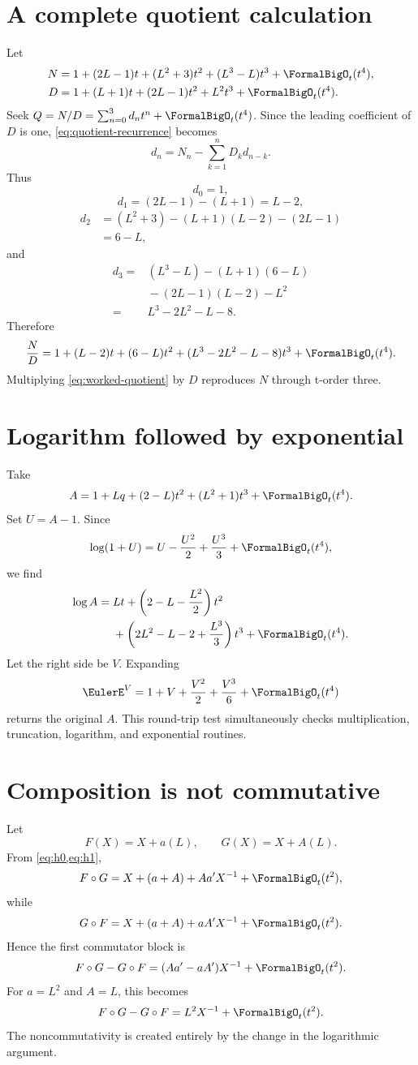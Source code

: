 \documentclass[11pt,openany]{book}
\theoremstyle{definition}
\theoremstyle{plain}
\theoremstyle{remark}
\newcommand{\compose}{\mathbin{\circ}}
\begin{document}
\section{A complete quotient calculation}
Let
\begin{align*}
 N={}&1+(2L-1)t+(L^2+3)t^2+(L^3-L)t^3+\FormalBigO_t(t^4),\\
 D={}&1+(L+1)t+(2L-1)t^2+L^2t^3+\FormalBigO_t(t^4).
\end{align*}
Seek \(Q=N/D=\sum_{n=0}^3d_nt^n+\FormalBigO_t(t^4)\).  Since the leading coefficient of
\(D\) is one, \cref{eq:quotient-recurrence} becomes
\[
 d_n=N_n-\sum_{k=1}^nD_kd_{n-k}.
\]
Thus
\[
 d_0=1,
\]
\[
 d_1=(2L-1)-(L+1)=L-2,
\]
\begin{align*}
 d_2&=(L^2+3)-(L+1)(L-2)-(2L-1)\\
 &=6-L,
\end{align*}
and
\begin{align*}
 d_3={}&(L^3-L)-(L+1)(6-L)\\
 &{}-(2L-1)(L-2)-L^2\\
={}&L^3-2L^2-L-8.
\end{align*}
Therefore
\begin{equation}\label{eq:worked-quotient}
 \frac ND=1+(L-2)t+(6-L)t^2
 +(L^3-2L^2-L-8)t^3+\FormalBigO_t(t^4).
\end{equation}
Multiplying \cref{eq:worked-quotient} by \(D\) reproduces \(N\) through
t-order three.

\section{Logarithm followed by exponential}
Take
\[
 A=1+Lq+(2-L)t^2+(L^2+1)t^3+\FormalBigO_t(t^4).
\]
Set \(U=A-1\).  Since
\[
 \log(1+U)=U-\frac{U^2}{2}+\frac{U^3}{3}+\FormalBigO_t(t^4),
\]
we find
\begin{equation}\label{eq:worked-log}
\begin{split}
 \log A={}&Lt+
 \left(2-L-\frac{L^2}{2}\right)t^2\\
 &+\left(2L^2-L-2+\frac{L^3}{3}\right)t^3
 +\FormalBigO_t(t^4).
\end{split}
\end{equation}
Let the right side be \(V\).  Expanding
\[
 \EulerE^V=1+V+\frac{V^2}{2}+\frac{V^3}{6}+\FormalBigO_t(t^4)
\]
returns the original \(A\).  This round-trip test simultaneously checks
multiplication, truncation, logarithm, and exponential routines.

\section{Composition is not commutative}
Let
\[
 F(X)=X+a(L),
 \qquad
 G(X)=X+A(L).
\]
From \cref{eq:h0,eq:h1},
\[
 F\compose G
 =X+(a+A)+Aa'X^{-1}+\FormalBigO_t(t^2),
\]
while
\[
 G\compose F
 =X+(a+A)+aA'X^{-1}+\FormalBigO_t(t^2).
\]
Hence the first commutator block is
\begin{equation}\label{eq:composition-commutator}
 F\compose G-G\compose F
 =(Aa'-aA')X^{-1}+\FormalBigO_t(t^2).
\end{equation}
For \(a=L^2\) and \(A=L\), this becomes
\[
 F\compose G-G\compose F=L^2X^{-1}+\FormalBigO_t(t^2).
\]
The noncommutativity is created entirely by the change in the logarithmic
argument.
\end{document}
